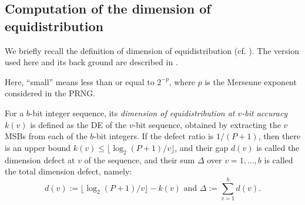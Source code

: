 \documentclass{svmult}
\def\bbf2{\ifmmode \mathbb{F}_2 \else $\mathbb{F}_2$ \fi}
\begin{document}
\subsection{Computation of the dimension of equidistribution}
\label{sec:DE}
We briefly recall the definition of dimension of 
equidistribution (cf. \cite{CLT}\cite{COMBTAUS}\cite{SFMT}).
The version used here and its back ground are described in \cite{SFMT}. 
Here, ``small'' means less than or equal to $2^{-p}$, where $p$ 
is the Mersenne exponent considered in the PRNG. 

For a $b$-bit integer sequence, its {\em dimension of 
equidistribution at $v$-bit accuracy} $k(v)$
is defined as the DE of the $v$-bit sequence, obtained by extracting
the $v$ MSBs from each of the $b$-bit integers.
If the defect ratio is $1/(P+1)$, 
then there is an upper bound 
$k(v) \leq \lfloor \log_2 (P+1) / v \rfloor$,
and their gap $d(v)$ is 
called the dimension defect at $v$ of the sequence,
and their sum $\Delta$ over $v=1,\ldots,b$ is called
the total dimension defect, namely: 
\[
d(v):=\lfloor \log_2 (P+1) / v \rfloor -k(v) 
\mbox{ and } \Delta:=\sum_{v=1}^b d(v).
\]
\end{document}
